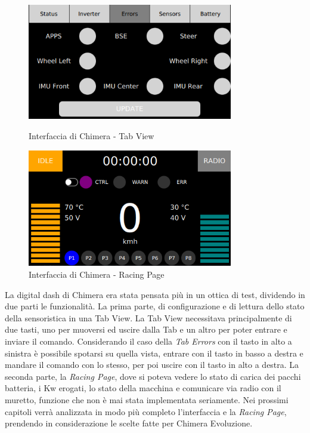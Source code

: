 
\begin{figure}[h!]
    \centering
    \begin{minipage}{0.5\textwidth}
        \centering
        \includegraphics[width=0.8\textwidth]{./figures/oldUI/tabErrors.png}
        \caption{Interfaccia di Chimera - Tab View}
    \end{minipage}\hfill
    \begin{minipage}{0.5\textwidth}
        \centering
        \includegraphics[width=0.8\textwidth]{./figures/oldUI/racingPage.png}
        \caption{Interfaccia di Chimera - Racing Page}
    \end{minipage}
\end{figure}

La digital dash di Chimera era stata pensata più in un ottica di test,
dividendo in due parti le funzionalità.
La prima parte, di configurazione e di lettura dello stato della sensoristica 
in una Tab View.
La Tab View necessitava principalmente di due tasti, uno per muoversi ed uscire dalla 
Tab e un altro per poter entrare e inviare il comando. Considerando il caso della \emph{Tab Errors} 
con il tasto in alto a sinistra è possibile spotarsi su quella vista, entrare con il tasto in basso a destra
e mandare il comando con lo stesso, per poi uscire con il tasto in alto a destra. 
La seconda parte, la \emph{Racing Page}, dove si poteva vedere lo stato di carica dei pacchi batteria,
i Kw erogati, lo stato della macchina e comunicare via radio con il muretto, funzione che non è mai stata implementata seriamente.
Nei prossimi capitoli verrà analizzata in modo più completo l'interfaccia e la \emph{Racing Page}, 
prendendo in considerazione le scelte fatte per Chimera Evoluzione.

